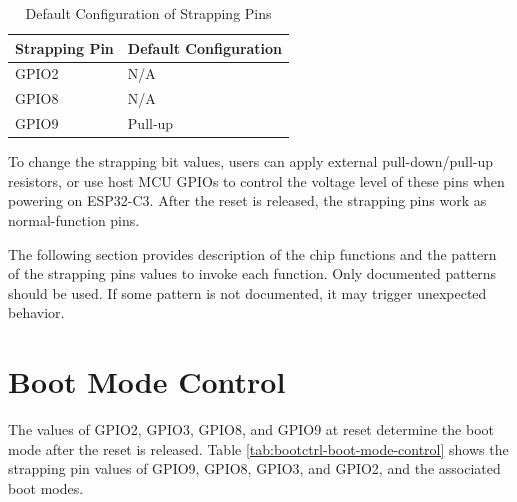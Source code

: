 \documentclass[main\_\_EN.tex]{subfiles}
\begin{document}
\begin{longtable}[c]{|p{2.5cm}|p{3.5cm}|}
\caption{Default Configuration of Strapping Pins}
\label{tab:bootctrl-default-config-strapping-pins} \\
    \hline
    \rowcolor{lightgray}
  \textbf{Strapping Pin} & \textbf{Default Configuration} \\ \hline
  GPIO2 & N/A \\ \hline
  GPIO8 & N/A \\ \hline
  GPIO9 & Pull-up \\ \hline
\end{longtable}

To change the strapping bit values, users can apply external pull-down/pull-up resistors, or use host MCU GPIOs to control the voltage level of these pins when powering on ESP32-C3. After the reset is released, the strapping pins work as normal-function pins.

\begin{tiplisting}
The following section provides description of the chip functions and the pattern of the strapping pins values to invoke each function. Only documented patterns should be used. If some pattern is not documented, it may trigger unexpected behavior.
\end{tiplisting}

\section{Boot Mode Control}\label{sec:bootModeControl}

The values of GPIO2, GPIO3, GPIO8, and GPIO9 at reset determine the boot mode after the reset is released. Table \ref{tab:bootctrl-boot-mode-control} shows the strapping pin values of GPIO9, GPIO8, GPIO3, and GPIO2, and the associated boot modes.
\end{document}
